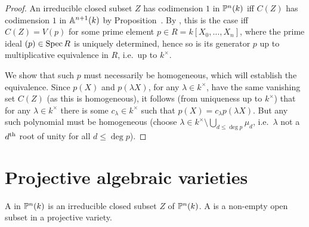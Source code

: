 \documentclass[a4paper,parskip=half,numbers=enddot, DIV=12, headheight=30pt]{scrreprt}
\begin{document}
\begin{proof}
An irreducible closed subset $Z$ has codimension $1$ in $\mathbb{P}^n(k)$ iff $C(Z)$ has codimension $1$ in $\mathbb{A}^{n+1}(k)$ by Proposition~. By \cite[Proposition~2.1.3]{alg1}, this is the case iff $C(Z) = V(p)$ for some prime element
$p\in R = k[X_0,\ldots,X_n]$, where the prime ideal $(p)\in \operatorname{Spec} R$ is uniquely determined, hence so is its generator $p$ up to multiplicative equivalence in $R$, i.e.\ up to $k^\times$.

We show that such $p$ must necessarily be homogeneous, which will establish the equivalence. Since $p(X)$ and $p(\lambda X)$, for any $\lambda\in k^\times$, have the same vanishing set $C(Z)$ (as this is homogeneous), it follows (from uniqueness up to $k^\times$) that for any $\lambda\in k^\times$ there is some $c_\lambda\in k^\times$ such that $p(X) = c_\lambda p(\lambda X)$. But any such polynomial must be homogeneous (choose $\lambda\in k^\times \setminus\bigcup_{d\leq\deg p} \mu_d$,
i.e.\ $\lambda$ not a $d^{\text{th}}$ root of unity for all $d\leq\deg p$).
\end{proof}

\section{Projective algebraic varieties}

\begin{defi}
    A  in $\mathbb{P}^n(k)$ is an irreducible closed subset $Z$ of $\mathbb{P}^n(k)$. A  is a non-empty open subset in a projective variety.
\end{defi}
\end{document}
